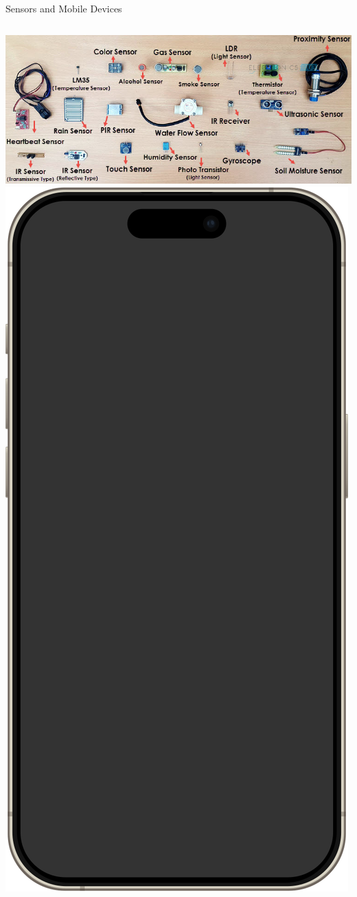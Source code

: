 \documentclass[aspectratio=169,xcolor=dvipsnames,svgnames,x11names,fleqn]{beamer}
\begin{document}
\begin{frame}{Sensors and Mobile Devices}
\centering
    \begin{columns}
          \includegraphics[width=0.99\linewidth]{figures/Types-of-Sensors-Image-2.jpg}
          \includegraphics[width=0.6\linewidth]{figures/iphone.png}
    \end{columns}
\end{frame}
\end{document}
